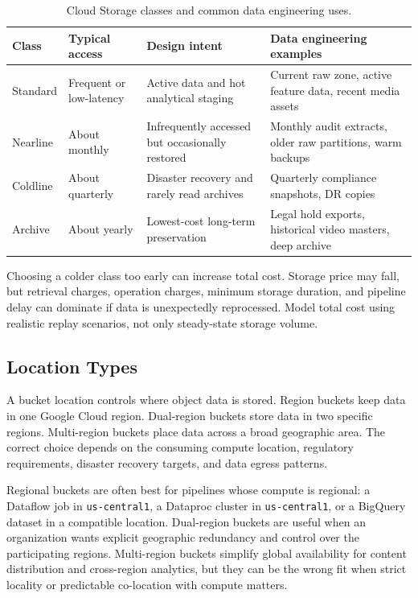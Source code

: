 \begin{table}[H]
\centering
\small
\begin{tabular}{@{}p{2.4cm}p{3.2cm}p{3.6cm}p{4.4cm}@{}}
\toprule
\textbf{Class} & \textbf{Typical access} & \textbf{Design intent} & \textbf{Data engineering examples} \\
\midrule
Standard & Frequent or low-latency & Active data and hot analytical staging & Current raw zone, active feature data, recent media assets \\
Nearline & About monthly & Infrequently accessed but occasionally restored & Monthly audit extracts, older raw partitions, warm backups \\
Coldline & About quarterly & Disaster recovery and rarely read archives & Quarterly compliance snapshots, DR copies \\
Archive & About yearly & Lowest-cost long-term preservation & Legal hold exports, historical video masters, deep archive \\
\bottomrule
\end{tabular}
\caption{Cloud Storage classes and common data engineering uses.}
\label{tab:storage-classes}
\end{table}

\begin{pitfall}
Choosing a colder class too early can increase total cost. Storage price may fall, but retrieval charges, operation charges, minimum storage duration, and pipeline delay can dominate if data is unexpectedly reprocessed. Model total cost using realistic replay scenarios, not only steady-state storage volume.
\end{pitfall}

\subsection{Location Types}
A bucket location controls where object data is stored. Region buckets keep data in one Google Cloud region. Dual-region buckets store data in two specific regions. Multi-region buckets place data across a broad geographic area. The correct choice depends on the consuming compute location, regulatory requirements, disaster recovery targets, and data egress patterns.

Regional buckets are often best for pipelines whose compute is regional: a Dataflow job in \texttt{us-central1}, a Dataproc cluster in \texttt{us-central1}, or a BigQuery dataset in a compatible location. Dual-region buckets are useful when an organization wants explicit geographic redundancy and control over the participating regions. Multi-region buckets simplify global availability for content distribution and cross-region analytics, but they can be the wrong fit when strict locality or predictable co-location with compute matters.

